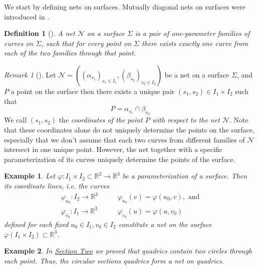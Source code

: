 \documentclass[10pt, a4paper]{article}
\theoremstyle{BoldTopSpacing}
\theoremstyle{BoldTopSpacing}
\theoremstyle{BoldTopSpacing}
\theoremstyle{BoldTopBottomSpacing}
\newtheorem{definition}{Definition}[section]
\theoremstyle{BoldTopSpacing}
\theoremstyle{BoldTopBottomSpacing}
\newtheorem{example}{Example}[section]
\theoremstyle{remark}
\newtheorem{remark}{\textit{Remark}}[section]
\begin{document}
We start by defining nets on surfaces. Mutually diagonal nets on surfaces were introduced in \cite{MutuallyDiagonalNets2019}.

\begin{definition}[]
\label{def:nets-on-surfaces}
A net $\mathcal{N}$ on a surface $\Sigma$ is a pair of one-parameter families of curves on $\Sigma$, such that for every point on $\Sigma$ there exists exactly one curve from each of the two families through that point.
\end{definition}

\begin{remark}[]
\label{rm:label}
Let $\mathcal{N} = \left( (\alpha_{s_{1}})_{s_{1} \in I_1}, (\beta_{s_{2}})_{s_{2} \in I_2} \right)$ be a net on a surface
$\Sigma$, and $P$ a point on the surface then there exists a unique pair $(s_{1}, s_{2}) \in I_{1}\times I_{2}$ such that
\[
    P = \alpha_{s_1} \cap \beta_{s_2}
\]
We call $(s_1, s_2)$ the \textit{coordinates of the point $P$ with respect to the net $\mathcal{N}$}. Note that these coordinates alone do not uniquely determine the points on the surface, especially that we don't assume that each two curves from different families of $\mathcal{N}$ intersect in one unique point. However, the net together with a specific parameterization of its curves uniquely determine the points of the surface.
\end{remark}

\begin{example}
\label{ex:coordinate-lines-form-net-on-surfaces}
Let $\varphi : I_{1} \times I_{2} \subset \mathbb{R}^2 \to \mathbb{R}^3$ be a parameterization of a surface. Then its
coordinate lines, i.e. the curves
\begin{align*}
    \varphi_{u_0} : I_{2} \to \mathbb{R}^3 &\quad \quad \varphi_{u_0}(v) = \varphi(u_0, v), \text{ and} \\
    \varphi_{v_0} : I_{1} \to \mathbb{R}^3 &\quad \quad \varphi_{v_0}(u) = \varphi(u, v_0)
\end{align*}
defined for each fixed $u_{0} \in I_1, v_{0} \in I_2$ constitute a net on the surface $\varphi\left( I_1 \times I_{2}
\right) \subset \mathbb{R}^3$.
\end{example}

\begin{example}
\label{ex:circular-sections-form-nets-on-quadrics}
In \hyperref[sec:circular-sections-of-quadrics]{Section Two} we proved that quadrics contain two circles through each point. Thus, the circular sections quadrics form a net on quadrics.
\end{example}
\end{document}
